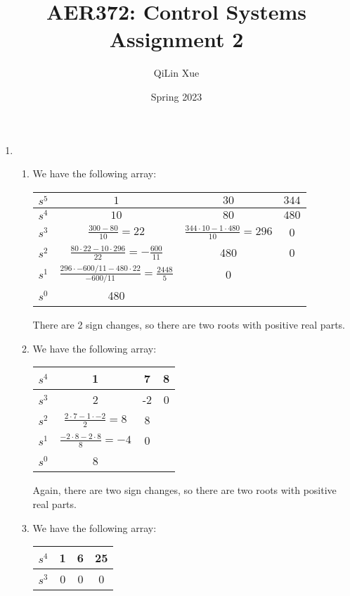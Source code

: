 \documentclass{article}
\title{AER372: Control Systems  \\ Assignment 2}
\author{QiLin Xue}
\date{Spring 2023}
\numberwithin{equation}{section}
\begin{document}
\maketitle
\begin{enumerate}[label=\textbf{2.\arabic*}]
    \item \begin{enumerate}[label=(\alph*)]
        \item We have the following array:
\begin{center}
    {\tabulinesep=1.2mm
   \begin{tabu}{c|c|c|c}
        $s^5$ & $1 $& $30 $& $344 $\\ \hline
        $s^4$ & $10$ &$ 80$ &$ 480$ \\ \hline
        $s^3$ & $\frac{300-80}{10} = 22 $ & $\frac{344 \cdot 10 - 1 \cdot 480}{10} = 296$ & 0\\ \hline
        $s^2$ & $\frac{80 \cdot 22 - 10\cdot 296}{22} = - \frac{600}{11}$ & 480 & 0 \\ \hline 
        $s^1$ & $\frac{296 \cdot -600/11 - 480 \cdot 22}{-600/11} = \frac{2448}{5}$ & 0 & \\ \hline
        $s^0$ & 480& & \\ 
    \end{tabu}
    }
\end{center}
There are 2 sign changes, so there are two roots with positive real parts.
\item We have the following array:
\begin{center}
    {\tabulinesep=1.2mm
    \begin{tabu}{c|c|c|c}
    $s^4$ & 1 & 7 & 8 \\ \hline
    $s^3$ & 2 & -2 & 0 \\ \hline
    $s^2$ & $\frac{2 \cdot 7 - 1 \cdot -2}{2} = 8$ & 8 & \\ \hline
    $s^1$ & $\frac{-2 \cdot 8 - 2\cdot 8}{8} = -4$ & 0 & \\ \hline
    $s^0$ & 8 & & \\
    \end{tabu}}
\end{center}
Again, there are two sign changes, so there are two roots with positive real parts.
\item We have the following array:
\begin{center}
    {\tabulinesep=1.2mm
    \begin{tabu}{c|c|c|c}
    $s^4$ & 1 & 6 & 25 \\ \hline 
    $s^3$ & 0 & 0 & 0 \\  

\end{tabu}}
\end{center}
\end{enumerate}
\end{enumerate}
\end{document}
